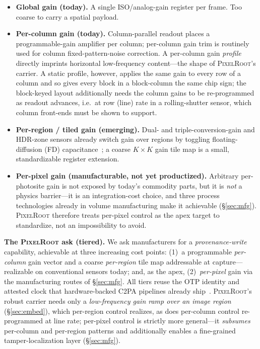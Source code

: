 \documentclass[journal]{IEEEtran}
\newcommand{\pr}{\textup{\textsc{PixelRoot}}}
\begin{document}
\begin{itemize}
\item \textbf{Global gain (today).} A single ISO/analog-gain register per frame.
Too coarse to carry a spatial payload.
\item \textbf{Per-column gain (today).} Column-parallel readout places a
programmable-gain amplifier per column; per-column gain trim is routinely used
for column fixed-pattern-noise correction. A per-column gain \emph{profile}
directly imprints horizontal low-frequency content---the shape of \pr{}'s
carrier. A static profile, however, applies the same gain to every row of a
column and so gives every block in a block-column the same chip sign; the
block-keyed layout additionally needs the column gains to be re-programmed as
readout advances, i.e.\ at row (line) rate in a rolling-shutter sensor, which
column front-ends must be shown to support.
\item \textbf{Per-region / tiled gain (emerging).} Dual- and triple-conversion-gain
and HDR-zone sensors already switch gain over regions by toggling
floating-diffusion (FD) capacitance~\cite{hdrcis2024review,dcg_fdshared2020,tcg_sony2022};
a coarse $K\times K$ gain tile map is a small, standardizable register extension.
\item \textbf{Per-pixel gain (manufacturable, not yet productized).} Arbitrary
per-photosite gain is not exposed by today's commodity parts, but it is
\emph{not} a physics barrier---it is an integration-cost choice, and three
process technologies already in volume manufacturing make it achievable
(\S\ref{sec:mfg}). \pr{} therefore treats per-pixel control as the apex target
to standardize, not an impossibility to avoid.
\end{itemize}
\fi

\noindent\textbf{The \pr{} ask (tiered).} We ask manufacturers for a
\emph{provenance-write} capability, achievable at three increasing cost points:
(1)~a programmable \emph{per-column} gain vector and a coarse \emph{per-region}
tile map addressable at capture---realizable on conventional sensors today; and,
as the apex, (2)~\emph{per-pixel} gain via the manufacturing routes of
\S\ref{sec:mfg}. All tiers reuse the OTP identity and attested clock that
hardware-backed C2PA pipelines already
ship~\cite{google2025c2pa,truepic2024capture}. \pr{}'s robust carrier needs only
a \emph{low-frequency gain ramp over an image region} (\S\ref{sec:embed}), which
per-region control realizes, as does per-column control re-programmed at line
rate; per-pixel control is strictly more general---it
\emph{subsumes} per-column and per-region patterns and additionally enables a
fine-grained tamper-localization layer (\S\ref{sec:mfg}).
\end{document}
